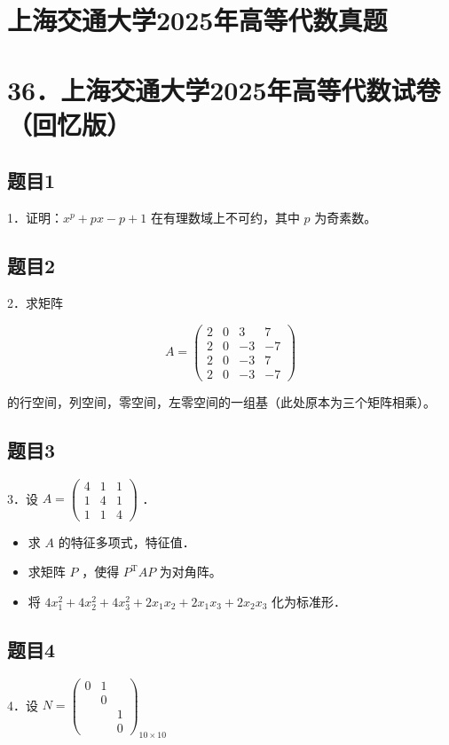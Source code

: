 \documentclass{article}
\begin{document}
\section*{上海交通大学2025年高等代数真题}
\section*{36．上海交通大学2025年高等代数试卷（回忆版）}

\subsection{题目1}
1．证明：\(x^{p}+p x-p+1\) 在有理数域上不可约，其中 \(p\) 为奇素数。

\subsection{题目2}
2．求矩阵

\[
A=\left(\begin{array}{cccc}
2 & 0 & 3 & 7 \\
2 & 0 & -3 & -7 \\
2 & 0 & -3 & 7 \\
2 & 0 & -3 & -7
\end{array}\right)
\]

的行空间，列空间，零空间，左零空间的一组基（此处原本为三个矩阵相乘）。

\subsection{题目3}
3．设 \(A=\left(\begin{array}{lll}4 & 1 & 1 \\ 1 & 4 & 1 \\ 1 & 1 & 4\end{array}\right)\) ．

\begin{itemize}
  \item[（1）] 求 \(A\) 的特征多项式，特征值．
  \item[（2）] 求矩阵 \(P\) ，使得 \(P^{\mathrm{T}} A P\) 为对角阵。
  \item[（3）] 将 \(4 x_{1}^{2}+4 x_{2}^{2}+4 x_{3}^{2}+2 x_{1} x_{2}+2 x_{1} x_{3}+2 x_{2} x_{3}\) 化为标准形．
\end{itemize}

\subsection{题目4}
4．设 \(N=\left(\begin{array}{rrr}0 & 1 & \\ & 0 & \\ & & 1 \\ & & 0\end{array}\right)_{10 \times 10}\)
\end{document}
